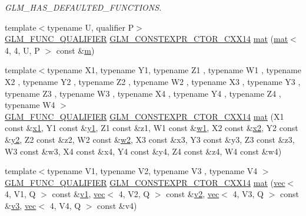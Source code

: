 \begin{DoxyCompactItemize}
\begin{DoxyCompactList}\small\item\em G\+L\+M\+\_\+\+H\+A\+S\+\_\+\+D\+E\+F\+A\+U\+L\+T\+E\+D\+\_\+\+F\+U\+N\+C\+T\+I\+O\+NS. \end{DoxyCompactList}\item 
{\footnotesize template$<$typename U, qualifier P$>$ }\\\hyperlink{setup_8hpp_a33fdea6f91c5f834105f7415e2a64407}{G\+L\+M\+\_\+\+F\+U\+N\+C\+\_\+\+Q\+U\+A\+L\+I\+F\+I\+ER} \hyperlink{setup_8hpp_a0900f9145e68bf6061b6f5e7be3fa751}{G\+L\+M\+\_\+\+C\+O\+N\+S\+T\+E\+X\+P\+R\+\_\+\+C\+T\+O\+R\+\_\+\+C\+X\+X14} \hyperlink{structglm_1_1mat_3_014_00_014_00_01_t_00_01_q_01_4_ad2beaa9b97c574cef34b46ee73c86501}{mat} (\hyperlink{structglm_1_1mat}{mat}$<$ 4, 4, U, P $>$ const \&\hyperlink{_s_d_l__opengl__glext_8h_af593500c283bf1a787a6f947f503a5c2}{m})
\item 
{\footnotesize template$<$typename X1, typename Y1, typename Z1 , typename W1 , typename X2 , typename Y2 , typename Z2 , typename W2 , typename X3 , typename Y3 , typename Z3 , typename W3 , typename X4 , typename Y4 , typename Z4 , typename W4 $>$ }\\\hyperlink{setup_8hpp_a33fdea6f91c5f834105f7415e2a64407}{G\+L\+M\+\_\+\+F\+U\+N\+C\+\_\+\+Q\+U\+A\+L\+I\+F\+I\+ER} \hyperlink{setup_8hpp_a0900f9145e68bf6061b6f5e7be3fa751}{G\+L\+M\+\_\+\+C\+O\+N\+S\+T\+E\+X\+P\+R\+\_\+\+C\+T\+O\+R\+\_\+\+C\+X\+X14} \hyperlink{structglm_1_1mat_3_014_00_014_00_01_t_00_01_q_01_4_ae64b907a3bd648bb5f89b20f1f06dd4c}{mat} (X1 const \&\hyperlink{_s_d_l__opengl__glext_8h_a49825216c96caaeb09237b36651181c5}{x1}, Y1 const \&\hyperlink{_s_d_l__opengl__glext_8h_a3af6c78fcdfccea028a5878bc747ef39}{y1}, Z1 const \&z1, W1 const \&\hyperlink{_s_d_l__opengl__glext_8h_ab5b747bf5adb1f9134337c30b9a4ce84}{w1}, X2 const \&\hyperlink{_s_d_l__opengl__glext_8h_a7b907a03236685c534d89d604cff23c8}{x2}, Y2 const \&\hyperlink{_s_d_l__opengl__glext_8h_a2be1135ed68e8d80fa9e130c7814f8c2}{y2}, Z2 const \&z2, W2 const \&\hyperlink{_s_d_l__opengl__glext_8h_a1ca5aca787be24213d9591fdf074b094}{w2}, X3 const \&x3, Y3 const \&y3, Z3 const \&z3, W3 const \&w3, X4 const \&x4, Y4 const \&y4, Z4 const \&z4, W4 const \&w4)
\item 
{\footnotesize template$<$typename V1, typename V2, typename V3 , typename V4 $>$ }\\\hyperlink{setup_8hpp_a33fdea6f91c5f834105f7415e2a64407}{G\+L\+M\+\_\+\+F\+U\+N\+C\+\_\+\+Q\+U\+A\+L\+I\+F\+I\+ER} \hyperlink{setup_8hpp_a0900f9145e68bf6061b6f5e7be3fa751}{G\+L\+M\+\_\+\+C\+O\+N\+S\+T\+E\+X\+P\+R\+\_\+\+C\+T\+O\+R\+\_\+\+C\+X\+X14} \hyperlink{structglm_1_1mat_3_014_00_014_00_01_t_00_01_q_01_4_a64d62a7aac7c48e676c72563f1e4c100}{mat} (\hyperlink{structglm_1_1vec}{vec}$<$ 4, V1, Q $>$ const \&\hyperlink{_s_d_l__opengl__glext_8h_a435c176a02c061b43e19bdf7c86cceae}{v1}, \hyperlink{structglm_1_1vec}{vec}$<$ 4, V2, Q $>$ const \&\hyperlink{_s_d_l__opengl__glext_8h_a0928f6d0f0f794ba000a21dfae422136}{v2}, \hyperlink{structglm_1_1vec}{vec}$<$ 4, V3, Q $>$ const \&\hyperlink{_s_d_l__opengl__glext_8h_acc806b31cbf466ceba6555983d8b814d}{v3}, \hyperlink{structglm_1_1vec}{vec}$<$ 4, V4, Q $>$ const \&v4)

\end{DoxyCompactItemize}
